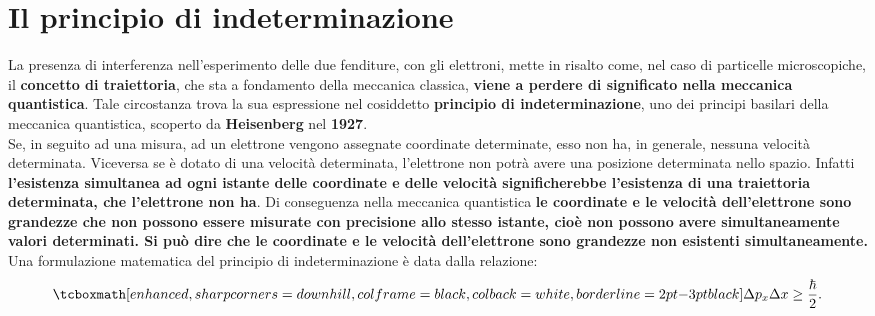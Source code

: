 \documentclass[a4paper,12pt,oneside]{book}
\begin{document}
\section{Il principio di indeterminazione}
La presenza di interferenza nell'esperimento delle due fenditure, con gli elettroni, mette in risalto come, nel caso di particelle microscopiche, il \textbf{concetto di traiettoria}, che sta a fondamento della meccanica classica, \textbf{viene a perdere di significato nella meccanica quantistica}. Tale circostanza trova la sua espressione nel cosiddetto \textbf{principio di indeterminazione}, uno dei principi basilari della meccanica quantistica, scoperto da \textbf{Heisenberg} nel \textbf{1927}.\\
Se, in seguito ad una misura, ad un elettrone vengono assegnate coordinate determinate, esso non ha, in generale, nessuna velocità determinata. Viceversa se è dotato di una velocità determinata, l'elettrone non potrà avere una posizione determinata nello spazio. Infatti \textbf{l'esistenza simultanea ad ogni istante delle coordinate e delle velocità significherebbe l'esistenza di una traiettoria determinata, che l'elettrone non ha}. Di conseguenza nella meccanica quantistica \textbf{le coordinate e le velocità dell'elettrone sono grandezze che non possono essere misurate con precisione allo stesso istante, cioè non possono avere simultaneamente valori determinati. Si può dire che le coordinate e le velocità dell'elettrone sono grandezze non esistenti simultaneamente.}\\
Una formulazione matematica del principio di indeterminazione è data dalla relazione:
	\begin{equation}
		\tcboxmath[enhanced, sharp corners=downhill, colframe=black, colback=white, borderline={2pt}{-3pt}{black}]{
			\Delta p_x \Delta x \geq \frac{\hbar}{2}.
			}
	\end{equation}
\end{document}
